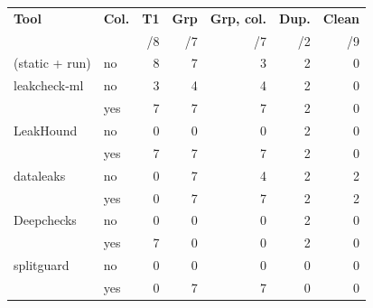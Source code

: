 \begin{tabular}{@{}llrrrrr@{}}
\toprule
\textbf{Tool} & \textbf{Col.} & \textbf{T1} & \textbf{Grp} & \textbf{Grp, col.} & \textbf{Dup.} & \textbf{Clean} \\
 & & /8 & /7 & /7 & /2 & /9 \\
\midrule
\tool{} (static + run) & no & 8 & 7 & 3 & 2 & 0 \\
\midrule
leakcheck-ml & no & 3 & 4 & 4 & 2 & 0 \\
 & yes & 7 & 7 & 7 & 2 & 0 \\
LeakHound & no & 0 & 0 & 0 & 2 & 0 \\
 & yes & 7 & 7 & 7 & 2 & 0 \\
dataleaks & no & 0 & 7 & 4 & 2 & 2 \\
 & yes & 0 & 7 & 7 & 2 & 2 \\
Deepchecks & no & 0 & 0 & 0 & 2 & 0 \\
 & yes & 7 & 0 & 0 & 2 & 0 \\
splitguard & no & 0 & 0 & 0 & 0 & 0 \\
 & yes & 0 & 7 & 7 & 0 & 0 \\
\bottomrule
\end{tabular}
